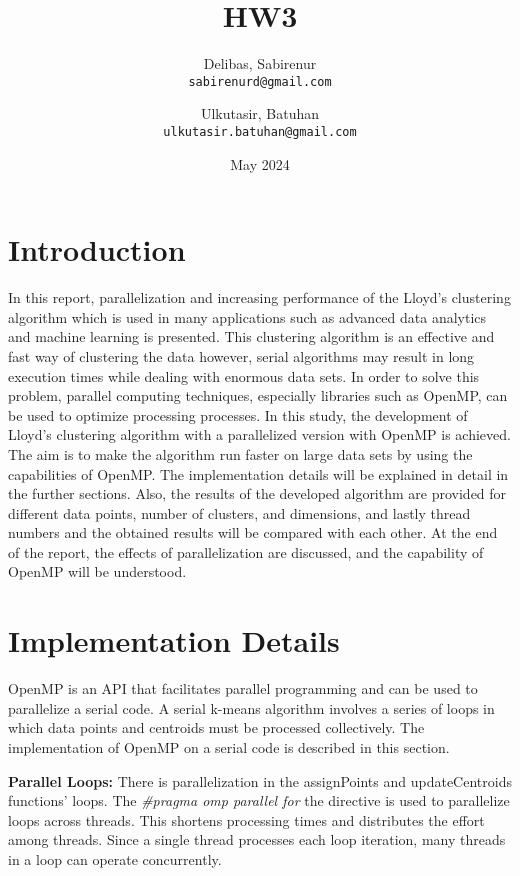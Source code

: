 \documentclass{article}
\title{HW3}
\author{Delibas, Sabirenur\\
  \texttt{sabirenurd@gmail.com}
  \and
  Ulkutasir, Batuhan\\
  \texttt{ulkutasir.batuhan@gmail.com}}
\date{May 2024}
\begin{document}
\maketitle

\section{Introduction}
In this report, parallelization and increasing performance of the Lloyd's clustering algorithm which is used in many applications such as advanced data analytics and machine learning is presented. This clustering algorithm is an effective and fast way of clustering the data however, serial algorithms may result in long execution times while dealing with enormous data sets. In order to solve this problem, parallel computing techniques, especially libraries such as OpenMP, can be used to optimize processing processes.
In this study, the development of Lloyd's clustering algorithm with a parallelized version with OpenMP is achieved. The aim is to make the algorithm run faster on large data sets by using the capabilities of OpenMP.
The implementation details will be explained in detail in the further sections. Also, the results of the developed algorithm are provided for different data points, number of clusters, and dimensions, and lastly thread numbers and the obtained results will be compared with each other. At the end of the report, the effects of parallelization are discussed, and the capability of OpenMP will be understood.


\section{Implementation Details}

OpenMP is an API that facilitates parallel programming and can be used to parallelize a serial code. A serial k-means algorithm involves a series of loops in which data points and centroids must be processed collectively. The implementation of OpenMP on a serial code is described in this section. \newline

\textbf{Parallel Loops:} There is parallelization in the assignPoints and updateCentroids functions' loops. The \textit{\#pragma omp parallel for} the directive is used to parallelize loops across threads. This shortens processing times and distributes the effort among threads. Since a single thread processes each loop iteration, many threads in a loop can operate concurrently.
\end{document}
